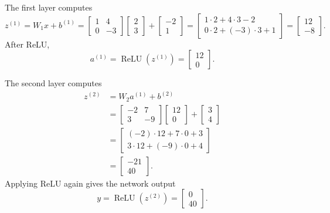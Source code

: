 \documentclass[11pt,openany,oneside]{book}
\begin{document}
The first layer computes
\[
    z^{(1)} = W_1x + b^{(1)} =
    \begin{bmatrix}
    1 & 4 \\
    0 & -3
    \end{bmatrix}
    \begin{bmatrix}
    2 \\ 3
    \end{bmatrix}
    +
    \begin{bmatrix}
    -2 \\ 1
    \end{bmatrix}
    =
    \begin{bmatrix}
    1 \cdot 2 + 4 \cdot 3 - 2 \\
    0 \cdot 2 + (-3) \cdot 3 + 1
    \end{bmatrix}
    =
    \begin{bmatrix}
    12 \\ -8
    \end{bmatrix}.
\]
After ReLU,
\[
    a^{(1)} = \operatorname{ReLU}(z^{(1)}) =
    \begin{bmatrix}
    12 \\ 0
    \end{bmatrix}.
\]

The second layer computes
\begin{align*}
    z^{(2)}
    &= W_2a^{(1)} + b^{(2)} \\
    &=
    \begin{bmatrix}
    -2 & 7 \\
    3 & -9
    \end{bmatrix}
    \begin{bmatrix}
    12 \\ 0
    \end{bmatrix}
    +
    \begin{bmatrix}
    3 \\ 4
    \end{bmatrix}
    \\
    &=
    \begin{bmatrix}
    (-2) \cdot 12 + 7 \cdot 0 + 3 \\
    3 \cdot 12 + (-9) \cdot 0 + 4
    \end{bmatrix}
    \\
    &=
    \begin{bmatrix}
    -21 \\ 40
    \end{bmatrix}.
\end{align*}
Applying ReLU again gives the network output
\[
    y = \operatorname{ReLU}(z^{(2)}) =
    \begin{bmatrix}
    0 \\ 40
    \end{bmatrix}.
\]
\end{document}

